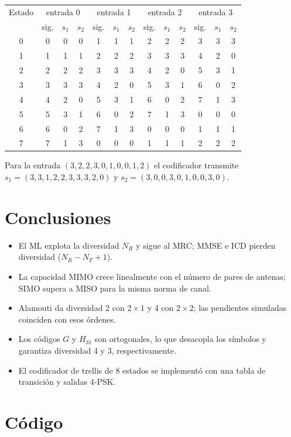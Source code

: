 \documentclass[11pt,a4paper]{article}
\newcommand{\listado}[1]{%
  \VerbatimInput[fontsize=\scriptsize,breaklines=true,breakanywhere=true,
    frame=single,framesep=2pt,rulecolor=\color{gray!50},numbers=left,
    numbersep=4pt]{#1}}
\begin{document}
\begin{center}
\small
\begin{tabular}{@{}c|ccc|ccc|ccc|ccc@{}}
  \toprule
  Estado & \multicolumn{3}{c|}{entrada 0} & \multicolumn{3}{c|}{entrada 1}
  & \multicolumn{3}{c|}{entrada 2} & \multicolumn{3}{c}{entrada 3}\\
  & sig. & $s_1$ & $s_2$ & sig. & $s_1$ & $s_2$ & sig. & $s_1$ & $s_2$
  & sig. & $s_1$ & $s_2$\\
  \midrule
  0 & 0 & 0 & 0 & 1 & 1 & 1 & 2 & 2 & 2 & 3 & 3 & 3\\
  1 & 1 & 1 & 1 & 2 & 2 & 2 & 3 & 3 & 3 & 4 & 2 & 0\\
  2 & 2 & 2 & 2 & 3 & 3 & 3 & 4 & 2 & 0 & 5 & 3 & 1\\
  3 & 3 & 3 & 3 & 4 & 2 & 0 & 5 & 3 & 1 & 6 & 0 & 2\\
  4 & 4 & 2 & 0 & 5 & 3 & 1 & 6 & 0 & 2 & 7 & 1 & 3\\
  5 & 5 & 3 & 1 & 6 & 0 & 2 & 7 & 1 & 3 & 0 & 0 & 0\\
  6 & 6 & 0 & 2 & 7 & 1 & 3 & 0 & 0 & 0 & 1 & 1 & 1\\
  7 & 7 & 1 & 3 & 0 & 0 & 0 & 1 & 1 & 1 & 2 & 2 & 2\\
  \bottomrule
\end{tabular}
\end{center}

\noindent Para la entrada $(3,2,2,3,0,1,0,0,1,2)$ el codificador transmite
$s_1=(3,3,1,2,2,3,3,3,2,0)$ y $s_2=(3,0,0,3,0,1,0,0,3,0)$.

\section*{Conclusiones}

\begin{itemize}
  \item El ML explota la diversidad $N_R$ y sigue al MRC; MMSE e ICD pierden
        diversidad ($N_R-N_T+1$).
  \item La capacidad MIMO crece linealmente con el número de pares de
        antenas; SIMO supera a MISO para la misma norma de canal.
  \item Alamouti da diversidad 2 con $2\times1$ y 4 con $2\times2$; las
        pendientes simuladas coinciden con esos órdenes.
  \item Los códigos $G$ y $H_{31}$ son ortogonales, lo que desacopla los
        símbolos y garantiza diversidad 4 y 3, respectivamente.
  \item El codificador de trellis de 8 estados se implementó con una tabla
        de transición y salidas 4-PSK.
\end{itemize}

\appendix
\section{Código}
\listado{tarea4.py}
\end{document}
